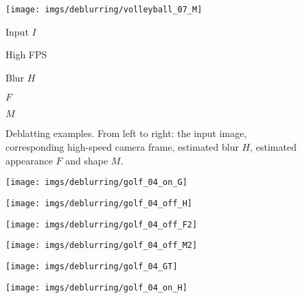 \documentclass[10pt,twocolumn,letterpaper]{article}
\begin{document}
\begin{figure}
\begin{minipage}[t]{.12\linewidth}
		\centering
		\texttt{[image: imgs/deblurring/volleyball\_07\_M]}
	\end{minipage}
\begin{minipage}[t]{.24\linewidth}
		\centering
		Input $I$
	\end{minipage}\hfill \begin{minipage}[t]{.24\linewidth}
		\centering
		High FPS\end{minipage}\hfill \begin{minipage}[t]{.24\linewidth}
		\centering
		Blur $H$
	\end{minipage}\hfill \begin{minipage}[t]{.12\linewidth}
		\centering
		$F$
	\end{minipage}\hfill \begin{minipage}[t]{.12\linewidth}
		\centering
		$M$
	\end{minipage}\caption{Deblatting examples. From left to right: the input image, corresponding high-speed camera frame, estimated blur $H$, estimated appearance $F$ and shape $M$.}
	\label{fig:deblurring_FMH}
\end{figure} \begin{figure}
	\noindent\begin{minipage}[t]{.24\linewidth}
		\centering
		\texttt{[image: imgs/deblurring/golf\_04\_on\_G]}
	\end{minipage}\hfill \begin{minipage}[t]{.24\linewidth}
		\centering
		\texttt{[image: imgs/deblurring/golf\_04\_off\_H]}
	\end{minipage}\hfill \begin{minipage}[t]{.24\linewidth}
		\centering
		\setlength{\fboxsep}{0pt}\texttt{[image: imgs/deblurring/golf\_04\_off\_F2]}
	\end{minipage}\hfill \begin{minipage}[t]{.24\linewidth}
		\centering
		\setlength{\fboxsep}{0pt}\texttt{[image: imgs/deblurring/golf\_04\_off\_M2]}
	\end{minipage}
\begin{minipage}[t]{.24\linewidth}
		\centering
		\texttt{[image: imgs/deblurring/golf\_04\_GT]}
	\end{minipage}\hfill \begin{minipage}[t]{.24\linewidth}
		\centering
		\texttt{[image: imgs/deblurring/golf\_04\_on\_H]}
	\end{minipage}\hfill \begin{minipage}[t]{.24\linewidth}

\end{minipage}
\end{figure}
\end{document}
